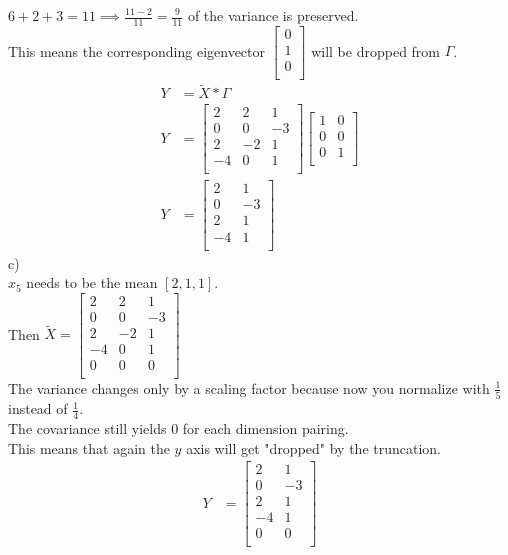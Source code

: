 \begin{flushleft}
$6 + 2 + 3 = 11 \implies \frac{11-2}{11} = \frac{9}{11}$ of the  variance is preserved.
\\
This means the corresponding eigenvector
$
\begin{bmatrix}
0 \\
1 \\
0 \\
\end{bmatrix}
$ will be dropped from $\Gamma$.
\\
\begin{align*}
Y &= \widetilde{X} * \Gamma
\\
Y &=
\begin{bmatrix}
2 & 2 & 1 \\
0 & 0 & -3 \\
2 & -2 & 1 \\
-4 & 0 & 1 \\
\end{bmatrix}
\begin{bmatrix}
1 & 0 \\
0 & 0 \\
0 & 1 \\
\end{bmatrix}
\\
Y &= 
\begin{bmatrix}
2 & 1 \\
0 & -3 \\
2 & 1 \\
-4 & 1 \\
\end{bmatrix}
\end{align*}
c)
\\
$x_{5}$ needs to be the mean $[2, 1, 1]$.\\
Then $\widetilde{X} = 
\begin{bmatrix}
2 & 2 & 1 \\
0 & 0 & -3 \\
2 & -2 & 1 \\
-4 & 0 & 1 \\
0 & 0 & 0 \\
\end{bmatrix}
$
\\
The variance changes only by a scaling factor because 
now you normalize with $\frac{1}{5}$ instead of $\frac{1}{4}$.\\
The covariance still yields $0$ for each dimension pairing.\\
This means that again the $y$ axis will get "dropped" by the truncation.
\begin{align*}
Y &= 
\begin{bmatrix}
2 & 1 \\
0 & -3 \\
2 & 1 \\
-4 & 1 \\
0 & 0 \\
\end{bmatrix}
\end{align*}
\end{flushleft}
%
%

